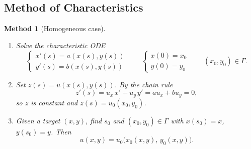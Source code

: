\documentclass{article}
\newtheorem{method}{Method}
\begin{document}
\subsection{Method of Characteristics}
\begin{method}[Homogeneous case]
    \begin{enumerate}[label=(\arabic*)]
        \item Solve the characteristic ODE
        \begin{equation}
            \begin{cases}
                x'(s) = a(x(s), y(s)) \\
                y'(s) = b(x(s), y(s))
            \end{cases}
            \qquad
            \begin{cases}
                x(0) = x_0 \\
                y(0) = y_0
            \end{cases}
            \qquad (x_0, y_0) \in \Gamma.
        \end{equation}
        \item Set $z(s) = u(x(s), y(s))$. By the chain rule
        \begin{equation}
            z'(s) = u_x\, x' + u_y\, y' = a u_x + b u_y = 0,
        \end{equation}
        so $z$ is constant and $z(s) = u_0(x_0, y_0)$.
        \item Given a target $(x,y)$, find $s_0$ and $(x_0, y_0) \in \Gamma$ with $x(s_0) = x$, $y(s_0) = y$. Then
        \begin{equation}
            u(x,y) = u_0\big(x_0(x,y),\, y_0(x,y)\big).
        \end{equation}
    \end{enumerate}
\end{method}
\end{document}
